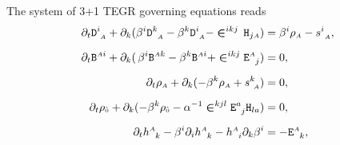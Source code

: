 \documentclass[
10pt, %
a4paper, %
oneside, %
twocolumn,
headinclude,footinclude, %
BCOR5mm, %
]{scrartcl}
\newcommand{\sA}{\mathsmaller A}
\newcommand{\sB}{\mathsmaller B}
\newcommand{\sC}{\mathsmaller C}
\newcommand{\sD}{\mathsmaller D}
\newcommand{\pd}[1]{\partial_{#1}}
\newcommand{\mg}[1]{\kappa_{#1}}			%
\newcommand{\tetrsymbol}{h}
\newcommand{\tetr}[2]{\tetrsymbol^{#1}_{\phantom{#1}#2}}
\newcommand{\stress}[2]{s_{\ #1}^{#2}}
\newcommand{\detTetr}{\tetrsymbol}
\newcommand{\aD}[2]{\mathcal{D}_{\phantom{#2}#1}^{#2}}	%
\newcommand{\Dfin}[2]{\mathtt{D}_{\phantom{#2}#1}^{#2}}	%
\newcommand{\Hfin}[2]{\mathtt{H}_{#2#1}}	%
\newcommand{\Efin}[2]{\mathtt{E}^{#1}_{\phantom{#1}#2}}	%
\newcommand{\Ufin}{\mathtt{U}}
\newcommand{\aB}[2]{\mathcal{B}^{#1#2}}	%
\newcommand{\Bfin}[2]{\mathtt{B}^{#1#2}}	%
\newcommand{\aU}{\mathcal{U}}%
\newcommand{\LCsymb}{\bm{\in}}    %
\newcommand{\rhs}[1]{f_{#1}}
\newcommand{\KD}[2]{\delta^{#1}_{\ #2}}
\newcommand{\indalg}[1]{\hat{\mathsmaller{#1}}}
\newcommand{\shift}[1]{\beta^{#1}}
\begin{document}
	The system of 3+1 TEGR governing equations reads
	\begin{subequations}\label{eqn.3+1.summary}
		\begin{align}%
			\pd{t} \Dfin{\sA}{i} + \pd{k}(\shift{i} 
			\Dfin{\sA}{k} - \shift{k}\Dfin{\sA}{i}  - \LCsymb^{ikj} \,
			\Hfin{\sA}{j}) & 
			= \shift{i} \rho_{\sA} - \stress{\sA}{i},
			\label{eqn.3+1.D}
			\\[2mm]
			\pd{t} \Bfin{\sA}{i} + \pd{k}(\,\shift{i} 
			\Bfin{\sA}{k} - \shift{k}\Bfin{\sA}{i}  + \LCsymb^{ikj} 
			\Efin{\sA}{j}) & 
			= 0,
			\label{eqn.3+1.B}
			\\[2mm]
			\pd{t} \rho_\sA +  \pd{k} (-\shift{k} \rho_\sA + \stress{\sA}{k}) &= 
			0,\label{eqn.3+1.m}\\[2mm]
			\pd{t} \rho_{\indalg{0}} + \pd{k} (-\shift{k} \rho_{\indalg{0}} 
			- \alpha^{-1} 
			\LCsymb^{kjl}\Efin{a}{j}\Hfin{a}{l}) &= 0,\label{eqn.3+1.e}\\[2mm]
			\pd{t} \tetr{\sA}{k} - \beta^i \pd{i} \tetr{\sA}{k} - \tetr{\sA}{i} \pd{k} \beta^i 
			& = 
			-\Efin{\sA}{k},
			\label{eqn.3+1.h}
		\end{align}
	\end{subequations}
\end{document}
